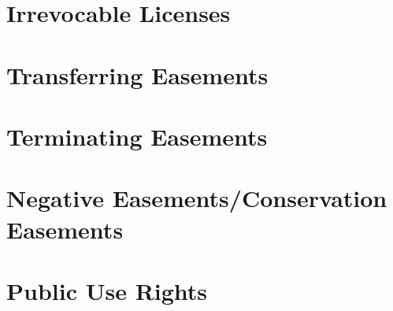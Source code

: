 




\begin{questions}

\end{questions}


\section{Irrevocable Licenses}





\begin{questions}


\end{questions}


%
%
%
%
%

%
%
%


\section{Transferring Easements}




\section{Terminating Easements}



\section{Negative Easements/Conservation Easements}





\section{Public Use Rights}










\begin{questions}

\end{questions}
